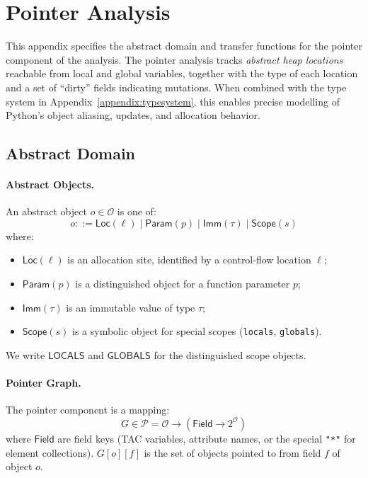 \section{Pointer Analysis}
\label{appendix:pointer}

This appendix specifies the abstract domain and transfer functions for the pointer component of the analysis.  
The pointer analysis tracks \emph{abstract heap locations} reachable from local and global variables, together with the type of each location and a set of ``dirty'' fields indicating mutations.  
When combined with the type system in Appendix~\ref{appendix:typesystem}, this enables precise modelling of Python's object aliasing, updates, and allocation behavior.

\subsection{Abstract Domain}

\paragraph{Abstract Objects.}
An abstract object $o \in \mathcal{O}$ is one of:
\[
o ::= \mathsf{Loc}(\ell) \mid \mathsf{Param}(p) \mid \mathsf{Imm}(\tau) \mid \mathsf{Scope}(s)
\]
where:
\begin{itemize}
\item $\mathsf{Loc}(\ell)$ is an allocation site, identified by a control-flow location $\ell$;
\item $\mathsf{Param}(p)$ is a distinguished object for a function parameter $p$;
\item $\mathsf{Imm}(\tau)$ is an immutable value of type $\tau$;
\item $\mathsf{Scope}(s)$ is a symbolic object for special scopes (\texttt{locals}, \texttt{globals}).
\end{itemize}

We write $\mathsf{LOCALS}$ and $\mathsf{GLOBALS}$ for the distinguished scope objects.

\paragraph{Pointer Graph.}
The pointer component is a mapping:
\[
G \in \mathcal{P} = \mathcal{O} \to (\mathsf{Field} \to 2^{\mathcal{O}})
\]
where $\mathsf{Field}$ are field keys (TAC variables, attribute names, or the special \texttt{"*"} for element collections).  
$G[o][f]$ is the set of objects pointed to from field $f$ of object $o$.

